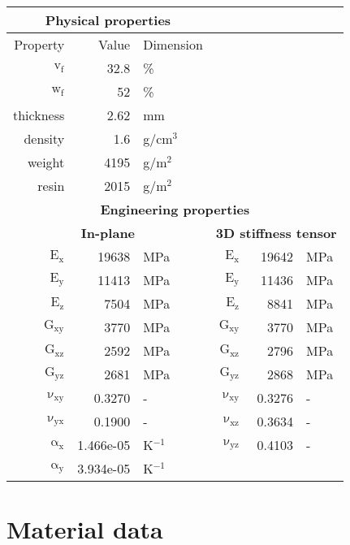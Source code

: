 \documentclass[a4paper,landscape,oneside,11pt,twocolumn]{memoir}
\begin{document}
\begin{table}[!htbp]
\begin{tabular}[t]{rcrrl}
      \bottomrule
    \end{tabular}\hspace{0.02\textwidth}
    \begin{tabular}[t]{rrlrrl}
      \multicolumn{3}{c}{\small\textbf{Physical properties}}\\[0.1em]
      \toprule
      Property & Value & Dimension\\
      \midrule
      $\mathrm{v_f}$ & 32.8 &\%\\
      $\mathrm{w_f}$ & 52 &\%\\
      thickness & 2.62 & mm\\
      density & 1.6 & g/cm$^3$\\
      weight & 4195 & g/m$^2$\\
      resin & 2015 & g/m$^2$\\
      \midrule
      \multicolumn{6}{c}{\small\textbf{Engineering properties}}\\[0.1em]
      \multicolumn{3}{c}{\small\textbf{In-plane}} &
        \multicolumn{3}{c}{\small\textbf{3D stiffness tensor}}\\[0.1em]
      $\mathrm{E_x}$ &    19638 & MPa & $\mathrm{E_x}$ &    19642 & MPa\\
      $\mathrm{E_y}$ &    11413 & MPa & $\mathrm{E_y}$ &    11436 & MPa\\
      $\mathrm{E_z}$ &     7504 & MPa & $\mathrm{E_z}$ &     8841 & MPa\\
      $\mathrm{G_{xy}}$ &     3770 & MPa & $\mathrm{G_{xy}}$ &     3770 & MPa\\
      $\mathrm{G_{xz}}$ &     2592 & MPa & $\mathrm{G_{xz}}$ &     2796 & MPa\\
      $\mathrm{G_{yz}}$ &     2681 & MPa &  $\mathrm{G_{yz}}$ &     2868 & MPa\\
      $\mathrm{\nu_{xy}}$ & 0.3270 &- &$\mathrm{\nu_{xy}}$ & 0.3276 &-\\
      $\mathrm{\nu_{yx}}$ & 0.1900 &- & $\mathrm{\nu_{xz}}$ & 0.3634 &-\\
      $\mathrm{\alpha_x}$ & 1.466e-05 & K$^{-1}$ &$\mathrm{\nu_{yz}}$ & 0.4103 &-\\
      $\mathrm{\alpha_y}$ & 3.934e-05 & K$^{-1}$\\
      \bottomrule
    \end{tabular}
\end{table}


\section{Material data} %
\end{document}
